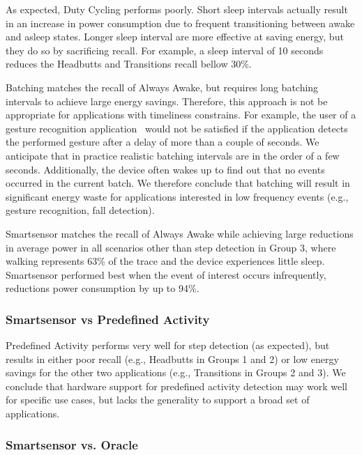 As expected, Duty Cycling performs poorly.  Short sleep intervals
actually result in an increase in power consumption due to frequent
transitioning between awake and asleep states.  Longer sleep interval
are more effective at saving energy, but they do so by sacrificing
recall.  For example, a sleep interval of 10 seconds reduces the
Headbutts and Transitions recall bellow 30\%.

Batching matches the recall of Always Awake, but requires long
batching intervals to achieve large energy savings.  Therefore, this
approach is not be appropriate for applications with timeliness
constrains.  For example, the user of a gesture recognition
application~\cite{liu2009uwave,schlomer2008gesture} would not be
satisfied if the application detects the performed gesture after a
delay of more than a couple of seconds.  We anticipate that in
practice realistic batching intervals are in the order of a few
seconds.  Additionally, the device often wakes up to find out that no 
events occurred in the current batch. We therefore conclude that 
batching will result in significant energy waste for applications 
interested in low frequency events (e.g., gesture recognition, fall 
detection).

Smartsensor matches the recall of Always Awake while achieving large
reductions in average power in all scenarios other than step detection
in Group 3, where walking represents 63\% of the trace and the device
experiences little sleep.  Smartsensor performed best when the event
of interest occurs infrequently, reductions power consumption by up to
94\%.  

\subsubsection{Smartsensor vs Predefined Activity}

Predefined Activity performs very well for step detection (as
expected), but results in either poor recall (e.g., Headbutts in
Groups 1 and 2) or low energy savings for the other two applications
(e.g., Transitions in Groups 2 and 3).  We conclude that hardware
support for predefined activity detection may work well for specific
use cases, but lacks the generality to support a broad set of
applications.


\subsubsection{Smartsensor vs. Oracle}

